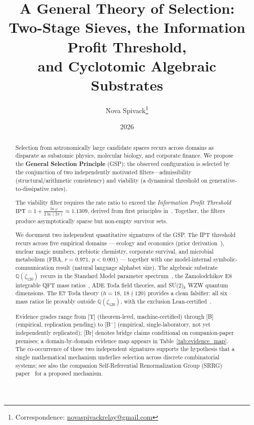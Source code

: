 \documentclass[11pt]{article}
\title{\bfseries A General Theory of Selection: \\[0.3em]
Two-Stage Sieves, the Information Profit Threshold, \\[0.2em]
and Cyclotomic Algebraic Substrates}
\author[1]{Nova Spivack\thanks{Correspondence:
  \href{mailto:novaspivackrelay@gmail.com}{novaspivackrelay@gmail.com}}}
\affil[1]{Independent Research}
\date{2026}
\theoremstyle{remark}
\newcommand{\IPT}{\mathrm{IPT}}
\newcommand{\zetaN}[1]{\zeta_{#1}}
\begin{document}
\maketitle
\NovaZenodoAfterTitle


\begin{abstract}
Selection from astronomically large candidate spaces recurs across domains as
disparate as subatomic physics, molecular biology, and corporate finance.
We propose the \textbf{General Selection Principle} (GSP): the observed
configuration is selected by the conjunction of two independently motivated
filters---admissibility (structural/arithmetic consistency) and viability
(a dynamical threshold on generative-to-dissipative rates).

The viability filter requires the rate ratio to exceed the
\emph{Information Profit Threshold} $\IPT = 1 + \frac{\ln\varphi}{2\ln(2\pi)}
\approx 1.1309$, derived from first principles in~\cite{SpivackIPT}.
Together, the filters produce asymptotically sparse but non-empty survivor sets.

We document two independent quantitative signatures of the GSP.
The IPT threshold recurs across five empirical domains --- ecology and economics
(prior derivation~\cite{SpivackIPT}), nuclear magic numbers, prebiotic chemistry,
corporate survival, and microbial metabolism (FBA, $r=0.971$, $p<0.001$) ---
together with one model-internal symbolic-communication result (natural language alphabet size).
The algebraic substrate $\mathbb{Q}(\zetaN{120})$ recurs in the Standard
Model parameter spectrum~\cite{Spivack2026_SM_UGP}, the Zamolodchikov E8
integrable QFT mass ratios~\cite{ugp-lean}, ADE Toda field theories, and
SU(2)$_k$ WZW quantum dimensions.
The E7 Toda theory ($h=18$, $18\nmid 120$) provides a clean falsifier: all
six mass ratios lie provably outside $\mathbb{Q}(\zetaN{120})$, with the
exclusion Lean-certified~\cite{ugp-lean}.

Evidence grades range from [T] (theorem-level, machine-certified) through [B]
(empirical, replication pending) to [B$^-$] (empirical, single-laboratory, not yet independently replicated); [Br]
denotes bridge claims conditional on companion-paper premises;
a domain-by-domain evidence map appears in Table~\ref{tab:evidence_map}.
The co-occurrence of these two independent signatures supports the hypothesis
that a single mathematical mechanism underlies selection across discrete
combinatorial systems; see also the companion Self-Referential Renormalization Group (SRRG) paper~\cite{SpivackSRRG}
for a proposed mechanism.
\end{abstract}
\end{document}

